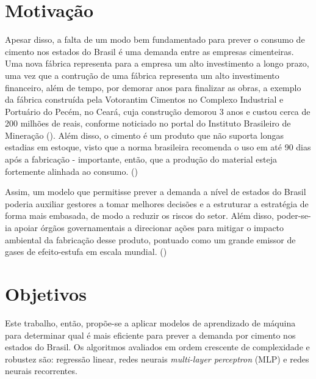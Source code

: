 \section*{Motivação}

Apesar disso, a falta de um modo bem fundamentado para prever o 
consumo de cimento nos estados do Brasil é 
uma demanda entre as empresas cimenteiras. Uma nova fábrica 
representa para a empresa um alto investimento a longo prazo,
uma vez que a contrução de uma fábrica representa um alto investimento
financeiro, além de tempo, por demorar anos para finalizar as obras, 
a exemplo da fábrica construída pela Votorantim Cimentos no Complexo 
Industrial e Portuário do Pecém, no Ceará, cuja construção 
demorou 3 anos e custou cerca de 200 milhões de reais, conforme 
noticiado no portal do Instituto Brasileiro de Mineração 
(\cite{fabrica-noticia}).
Além disso, o cimento é um produto que não suporta longas 
estadias em estoque, visto que a norma brasileira recomenda
o uso em até 90 dias após a fabricação - importante, então, que 
a produção do material esteja fortemente alinhada ao 
consumo. (\cite{abnt})

Assim, um modelo que permitisse prever a demanda a nível de 
estados do Brasil poderia auxiliar gestores a tomar melhores 
decisões e a estruturar a estratégia de forma mais embasada, de 
modo a reduzir os riscos do setor. Além disso, poder-se-ia apoiar órgãos 
governamentais a direcionar ações para mitigar o impacto ambiental da
fabricação desse produto, pontuado como um grande emissor de 
gases de efeito-estufa em escala mundial. (\cite{meio-ambiente})


\section*{Objetivos}

Este trabalho, então, propõe-se a  aplicar modelos de aprendizado 
de máquina para determinar qual é mais eficiente para prever a 
demanda por cimento nos estados do Brasil. Os algoritmos avaliados em ordem 
crescente de complexidade e robustez são: 
regressão linear, redes neurais  \textit{multi-layer perceptron} (MLP) 
e redes neurais recorrentes.



